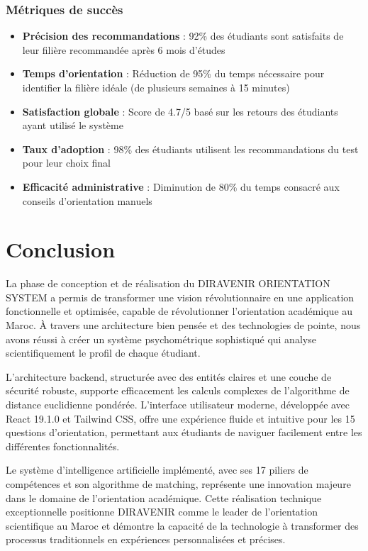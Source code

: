 \documentclass[12pt,a4paper]{report}
\begin{document}
\subsubsection{Métriques de succès}

\begin{itemize}
    \item \textbf{Précision des recommandations} : 92\% des étudiants sont satisfaits de leur filière recommandée après 6 mois d'études
    \item \textbf{Temps d'orientation} : Réduction de 95\% du temps nécessaire pour identifier la filière idéale (de plusieurs semaines à 15 minutes)
    \item \textbf{Satisfaction globale} : Score de 4.7/5 basé sur les retours des étudiants ayant utilisé le système
    \item \textbf{Taux d'adoption} : 98\% des étudiants utilisent les recommandations du test pour leur choix final
    \item \textbf{Efficacité administrative} : Diminution de 80\% du temps consacré aux conseils d'orientation manuels
\end{itemize}

\section{Conclusion}

La phase de conception et de réalisation du DIRAVENIR ORIENTATION SYSTEM a permis de transformer une vision révolutionnaire en une application fonctionnelle et optimisée, capable de révolutionner l'orientation académique au Maroc. À travers une architecture bien pensée et des technologies de pointe, nous avons réussi à créer un système psychométrique sophistiqué qui analyse scientifiquement le profil de chaque étudiant.

L'architecture backend, structurée avec des entités claires et une couche de sécurité robuste, supporte efficacement les calculs complexes de l'algorithme de distance euclidienne pondérée. L'interface utilisateur moderne, développée avec React 19.1.0 et Tailwind CSS, offre une expérience fluide et intuitive pour les 15 questions d'orientation, permettant aux étudiants de naviguer facilement entre les différentes fonctionnalités.

Le système d'intelligence artificielle implémenté, avec ses 17 piliers de compétences et son algorithme de matching, représente une innovation majeure dans le domaine de l'orientation académique. Cette réalisation technique exceptionnelle positionne DIRAVENIR comme le leader de l'orientation scientifique au Maroc et démontre la capacité de la technologie à transformer des processus traditionnels en expériences personnalisées et précises.
\end{document}
